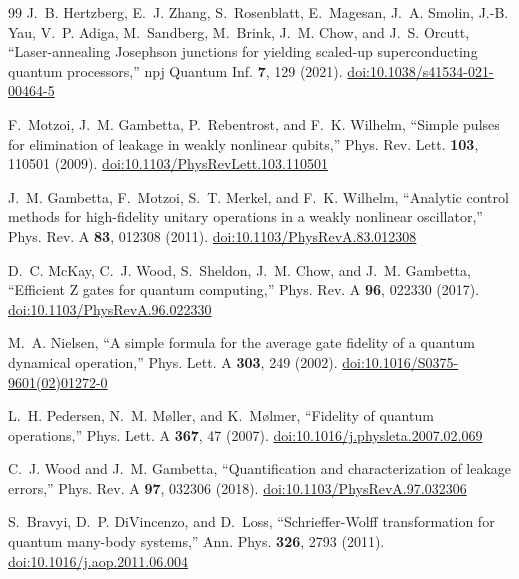\documentclass[11pt,a4paper]{article}
\begin{document}
\begin{thebibliography}{99}
J.~B. Hertzberg, E.~J. Zhang, S.~Rosenblatt, E.~Magesan, J.~A. Smolin, J.-B. Yau, V.~P. Adiga, M.~Sandberg, M.~Brink,
J.~M. Chow, and J.~S. Orcutt, ``Laser-annealing Josephson junctions for yielding scaled-up superconducting quantum
processors,'' npj Quantum Inf. \textbf{7}, 129 (2021).
\href{https://doi.org/10.1038/s41534-021-00464-5}{doi:10.1038/s41534-021-00464-5}

F.~Motzoi, J.~M. Gambetta, P.~Rebentrost, and F.~K. Wilhelm, ``Simple pulses for elimination of leakage in weakly
nonlinear qubits,'' Phys. Rev. Lett. \textbf{103}, 110501 (2009).
\href{https://doi.org/10.1103/PhysRevLett.103.110501}{doi:10.1103/PhysRevLett.103.110501}

J.~M. Gambetta, F.~Motzoi, S.~T. Merkel, and F.~K. Wilhelm, ``Analytic control methods for high-fidelity unitary
operations in a weakly nonlinear oscillator,'' Phys. Rev. A \textbf{83}, 012308 (2011).
\href{https://doi.org/10.1103/PhysRevA.83.012308}{doi:10.1103/PhysRevA.83.012308}

D.~C. McKay, C.~J. Wood, S.~Sheldon, J.~M. Chow, and J.~M. Gambetta, ``Efficient Z gates for quantum computing,''
Phys. Rev. A \textbf{96}, 022330 (2017). \href{https://doi.org/10.1103/PhysRevA.96.022330}{doi:10.1103/PhysRevA.96.022330}

M.~A. Nielsen, ``A simple formula for the average gate fidelity of a quantum dynamical operation,'' Phys. Lett. A
\textbf{303}, 249 (2002). \href{https://doi.org/10.1016/S0375-9601(02)01272-0}{doi:10.1016/S0375-9601(02)01272-0}

L.~H. Pedersen, N.~M. M\o ller, and K.~M\o lmer, ``Fidelity of quantum operations,'' Phys. Lett. A \textbf{367}, 47
(2007). \href{https://doi.org/10.1016/j.physleta.2007.02.069}{doi:10.1016/j.physleta.2007.02.069}

C.~J. Wood and J.~M. Gambetta, ``Quantification and characterization of leakage errors,'' Phys. Rev. A \textbf{97},
032306 (2018). \href{https://doi.org/10.1103/PhysRevA.97.032306}{doi:10.1103/PhysRevA.97.032306}

S.~Bravyi, D.~P. DiVincenzo, and D.~Loss, ``Schrieffer-Wolff transformation for quantum many-body systems,'' Ann.
Phys. \textbf{326}, 2793 (2011). \href{https://doi.org/10.1016/j.aop.2011.06.004}{doi:10.1016/j.aop.2011.06.004}


\end{thebibliography}
\end{document}
